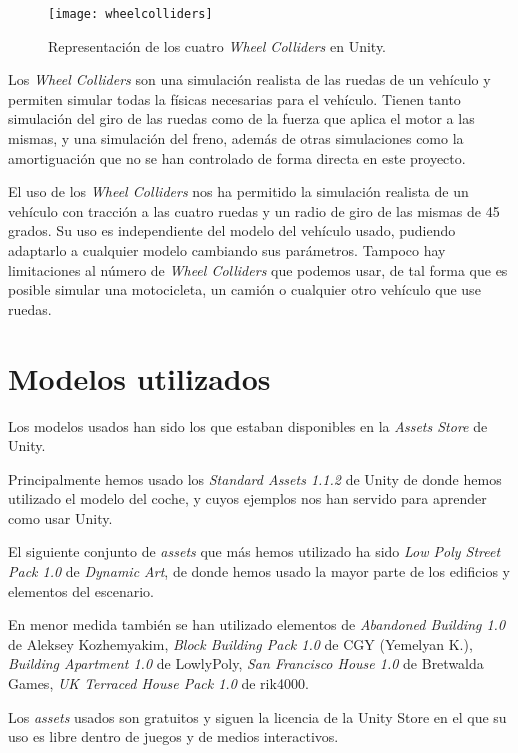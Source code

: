 \begin{figure}[htpb]
    \centering
    \texttt{[image: wheelcolliders]}
    \caption[Representación de los \textit{Wheel Colliders} en Unity]{Representación de los cuatro \textit{Wheel Colliders} en Unity.}
    \label{fig:basics AFM sketch}
\end{figure}

Los \textit{Wheel Colliders} son una simulación realista de las ruedas de un vehículo y permiten simular todas la físicas necesarias para el vehículo. Tienen tanto simulación del giro de las ruedas como de la fuerza que aplica el motor a las mismas, y una simulación del freno, además de otras simulaciones como la amortiguación que no se han controlado de forma directa en este proyecto.

El uso de los \textit{Wheel Colliders} nos ha permitido la simulación realista de un vehículo con tracción a las cuatro ruedas y un radio de giro de las mismas de 45 grados. Su uso es independiente del modelo del vehículo usado, pudiendo adaptarlo a cualquier modelo cambiando sus parámetros. Tampoco hay limitaciones al número de \textit{Wheel Colliders} que podemos usar, de tal forma que es posible simular una motocicleta, un camión o cualquier otro vehículo que use ruedas.

\section{Modelos utilizados}
Los modelos usados han sido los que estaban disponibles en la \textit{Assets Store} de Unity.

Principalmente hemos usado los \textit{Standard Assets 1.1.2} de Unity de donde hemos utilizado el modelo del coche, y cuyos ejemplos nos han servido para aprender como usar Unity.

El siguiente conjunto de \textit{assets} que más hemos utilizado ha sido \textit{Low Poly Street Pack 1.0} de \textit{Dynamic Art}, de donde hemos usado la mayor parte de los edificios y elementos del escenario.

En menor medida también se han utilizado elementos de \textit{Abandoned Building 1.0} de Aleksey Kozhemyakim, \textit{Block Building Pack 1.0} de CGY (Yemelyan K.), \textit{Building Apartment 1.0} de LowlyPoly, \textit{San Francisco House 1.0} de Bretwalda Games, \textit{UK Terraced House Pack 1.0} de rik4000.

Los \textit{assets} usados son gratuitos y siguen la licencia de la Unity Store en el que su uso es libre dentro de juegos y de medios interactivos.


